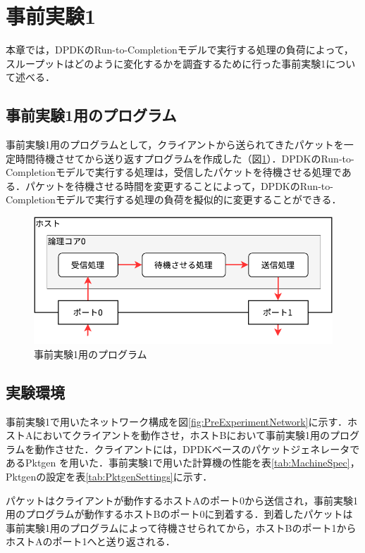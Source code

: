\section{事前実験1}
\label{sec:PreExperimentOne}
本章では，DPDKのRun-to-Completionモデルで実行する処理の負荷によって，スループットはどのように変化するかを調査するために行った事前実験1について述べる．

\subsection{事前実験1用のプログラム}
事前実験1用のプログラムとして，クライアントから送られてきたパケットを一定時間待機させてから送り返すプログラムを作成した（図\ref{fig:PreExperimentOne}）．DPDKのRun-to-Completionモデルで実行する処理は，受信したパケットを待機させる処理である．パケットを待機させる時間を変更することによって，DPDKのRun-to-Completionモデルで実行する処理の負荷を擬似的に変更することができる．

\begin{figure}[htb]
  \centering
  \includegraphics[width=\columnwidth]{pictures/PreExperimentOne.pdf}
  \caption{事前実験1用のプログラム}
  \label{fig:PreExperimentOne}
\end{figure}

\subsection{実験環境}
事前実験1で用いたネットワーク構成を図\ref{fig:PreExperimentNetwork}に示す．ホストAにおいてクライアントを動作させ，ホストBにおいて事前実験1用のプログラムを動作させた．クライアントには，DPDKベースのパケットジェネレータであるPktgen \cite{Pktgen} を用いた．事前実験1で用いた計算機の性能を表\ref{tab:MachineSpec}，Pktgenの設定を表\ref{tab:PktgenSettings}に示す．

パケットはクライアントが動作するホストAのポート0から送信され，事前実験1用のプログラムが動作するホストBのポート0に到着する．到着したパケットは事前実験1用のプログラムによって待機させられてから，ホストBのポート1からホストAのポート1へと送り返される．

